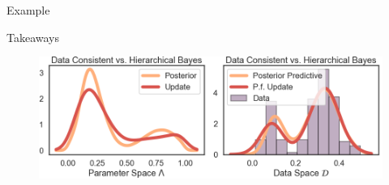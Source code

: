 \begin{block}{Example}
\end{block}


\vspace{-1.cm}


\begin{block}{Takeaways}

\centering
\vspace{-0.5cm}
\begin{figure}
        \includegraphics[width=30cm]{figures/distr_EX_comparison.png}
        \vspace{-0.5cm} 
        \caption{ }
    \end{figure}
\end{block}
